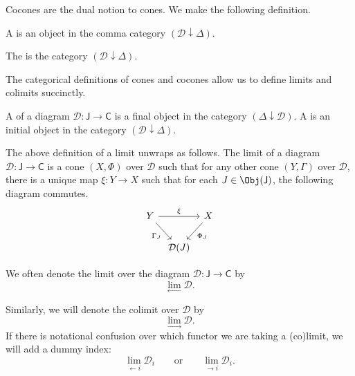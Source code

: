 \documentclass[notes.tex]{subfiles}
\begin{document}
Cocones are the dual notion to cones. We make the following definition.
\begin{definition}[cocone]
  \label{def:cocone}
  A  is an object in the comma category $(\mathcal{D} \downarrow \Delta)$.
\end{definition}

\begin{definition}
  \label{def:categoryofcocones}
  The  is the category $(\mathcal{D} \downarrow \Delta)$.
\end{definition}

The categorical definitions of cones and cocones allow us to define limits and colimits succinctly.
\begin{definition}
  \label{def:limitscolimits}
  A  of a diagram $\mathcal{D}\colon \mathsf{J} \rightarrow \mathsf{C}$ is a final object in the category $(\Delta \downarrow \mathcal{D})$. A  is an initial object in the category $(\mathcal{D} \downarrow \Delta)$.
\end{definition}

\begin{note}
  The above definition of a limit unwraps as follows. The limit of a diagram $\mathcal{D}\colon \mathsf{J} \rightarrow \mathsf{C}$ is a cone $(X, \Phi)$ over $\mathcal{D}$ such that for any other cone $(Y, \Gamma)$ over $\mathcal{D}$, there is a unique map $\xi\colon Y \to X$ such that for each $J \in \Obj(\mathsf{J})$, the following diagram commutes.
  \begin{equation*}
    \begin{tikzcd}[column sep=tiny]
      Y
      \arrow[rr, "\xi"]
      \arrow[dr, swap, "\Gamma_{J}"]
      & & X
      \arrow[dl, "\Phi_{J}"]
      \\
      & \mathcal{D}(J)
    \end{tikzcd}
  \end{equation*}
\end{note}

\begin{notation}
  We often denote the limit over the diagram $\mathcal{D}\colon \mathsf{J} \rightarrow \mathsf{C}$ by
  \begin{equation*}
    \lim_{\leftarrow} \mathcal{D}.
  \end{equation*}

  Similarly, we will denote the colimit over $\mathcal{D}$ by
  \begin{equation*}
    \lim_{\rightarrow} \mathcal{D}.
  \end{equation*}
  If there is notational confusion over which functor we are taking a (co)limit, we will add a dummy index:
  \begin{equation*}
    \lim_{\leftarrow i} \mathcal{D}_{i}\qquad\text{or}\qquad\lim_{\rightarrow i} \mathcal{D}_{i}.
  \end{equation*}
\end{notation}
\end{document}
